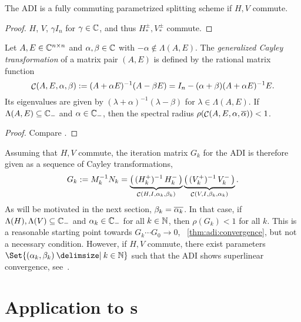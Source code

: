 \begin{corollary}
  The \ac{ADI} is a fully commuting parametrized splitting scheme if $H,V$ commute.
\end{corollary}
\begin{proof}
  $H$, $V$, $\gamma I_n$ for $\gamma\in\mathbb{C}$, and thus $H^\pm_*, V^\pm_*$ commute.
\end{proof}

\begin{lemma}
\label{thm:adi:cayley}
  Let $A, E\in\mathbb{C}^{n\times n}$ and $\alpha, \beta \in\mathbb{C}$ with $-\alpha\notin\Lambda(A, E)$.
  The \emph{generalized Cayley transformation} of a matrix pair $(A,E)$ is defined by
  the rational matrix function
  \begin{equation*}
    \mathop{\mathcal{C}}(A, E, \alpha, \beta)
    := (A+\alpha E)^{-1} (A-\beta E)
    = I_n - (\alpha + \beta) (A+\alpha E)^{-1} E
    .
  \end{equation*}
  Its eigenvalues are given by
  $(\lambda + \alpha)^{-1} (\lambda - \beta)$
  for $\lambda\in\Lambda(A, E)$.
  If $\Lambda(A, E) \subseteq \mathbb{C}_-$ and $\alpha\in\mathbb{C}_-$,
  then the spectral radius $\rho(\Cayley(A,E,\alpha,\conj\alpha)) < 1$.
\end{lemma}
\begin{proof}
  Compare \cite[Proposition~2.16]{Kuerschner2016}.
\end{proof}

Assuming that $H, V$ commute,
the iteration matrix $G_k$ for the \ac{ADI} is therefore given as a sequence of Cayley transformations,
\begin{equation}
\label{eq:adi:cayley}
  G_k
  := M_k^{-1} N_k
  = \underbrace{
    \big( \mathop{(\mathop{H_k^+})^{-1}}\mathop{H_k^-} \big)
  }_{
    \mathop{\mathcal{C}}(H, I, \alpha_k, \beta_k)
  } \underbrace{
    \big( \mathop{(\mathop{V_k^+})^{-1}}\mathop{V_k^-} \big)
  }_{
    \mathop{\mathcal{C}}(V, I, \beta_k, \alpha_k)
  }
  .
\end{equation}
As will be motivated in the next section, $\beta_k = \conj{\alpha_k}$.
In that case, if $\Lambda(H), \Lambda(V) \subseteq \mathbb{C}_-$
and $\alpha_k \in \mathbb{C}_-$ for all $k\in\mathbb{N}$, then $\rho(G_k) < 1$ for all $k$.
This is a reasonable starting point towards $G_k\cdots G_0 \to 0$,
\cf~\autoref{thm:adi:convergence},
but not a necessary condition.
However, if $H, V$ commute,
there exist parameters $\Set{(\alpha_k, \beta_k) \given k\in\N}$
such that the \ac{ADI} shows
superlinear convergence, see~\cite{Beckermann2010}.

\section{Application to \texorpdfstring{s}{ALEs}}
\label{sec:adi:ale}

